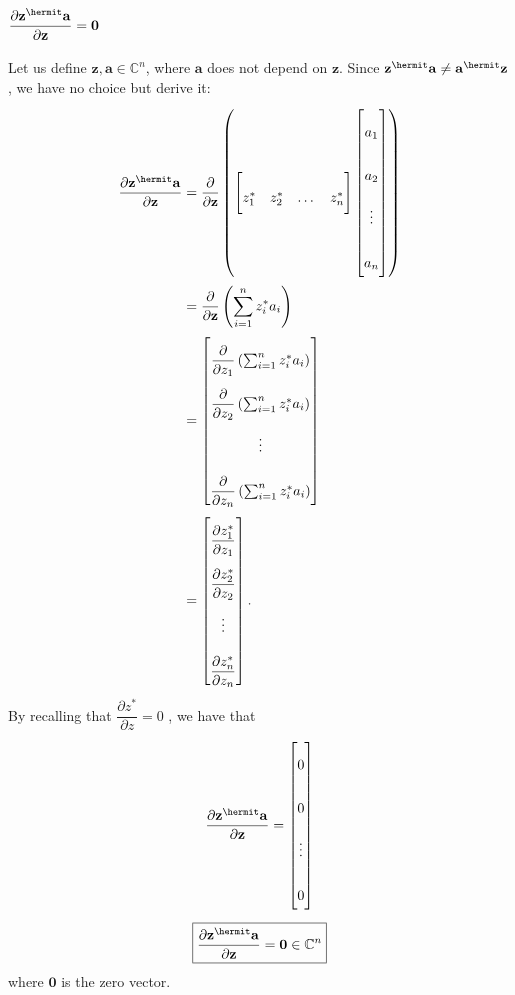 \subsection{\(\dfrac{\partial \mathbf{z}^\hermit \mathbf{a}}{\partial \mathbf{z}} = \mathbf{0}\)}
Let us define \(\mathbf{z}, \mathbf{a} \in \mathbb{C}^{n}\), where \(\mathbf{a}\) does not depend on \(\mathbf{z}\). Since \(\mathbf{z}^\hermit \mathbf{a} \neq \mathbf{a}^\hermit \mathbf{z}\), we have no choice but derive it:
\begin{align}
    \dfrac{\partial \mathbf{z}^\hermit \mathbf{a}}{\partial\mathbf{z}} & = \dfrac{\partial}{\partial\mathbf{z}} \left(
    \begin{bmatrix}
        z^*_1 & z^*_2 & \dots & z^*_n
    \end{bmatrix} \begin{bmatrix}
        a_{1} \\ a_{2} \\ \vdots \\ a_{n}
    \end{bmatrix} \right) \\
    & = \dfrac{\partial}{\partial\mathbf{z}} \left( \sum_{i = 1}^n z^*_ia_i \right) \\
    &= \begin{bmatrix}
            \dfrac{\partial}{\partial z_1} \left( \sum_{i = 1}^n z^*_ia_i \right) \\ \dfrac{\partial}{\partial z_2} \left( \sum_{i = 1}^n z^*_ia_i \right) \\ \vdots \\
            \dfrac{\partial}{\partial z_n} \left( \sum_{i = 1}^n z^*_ia_i \right)
        \end{bmatrix} \\
    & = \renewcommand{\arraystretch}{2.6}\begin{bmatrix}
        \dfrac{\partial z_1^*}{\partial z_1} \\ \dfrac{\partial z_2^*}{\partial z_2} \\ \vdots \\
        \dfrac{\partial z_n^*}{\partial z_n}
    \end{bmatrix}.
\end{align}
By recalling that \(\dfrac{\partial z^*}{\partial z} = 0\) \cite{hjorungnes2011complex}, we have that
\begin{align}
    \dfrac{\partial \mathbf{z}^\hermit \mathbf{a}}{\partial\mathbf{z}} = \begin{bmatrix}
        0 \\ 0 \\ \vdots \\ 0
    \end{bmatrix}
\end{align}
\begin{align}
    \boxed{\dfrac{\partial \mathbf{z}^\hermit \mathbf{a}}{\partial\mathbf{z}} = \mathbf{0} \in \mathbb{C}^{n}}
\end{align}
where \(\mathbf{0}\) is the zero vector.

